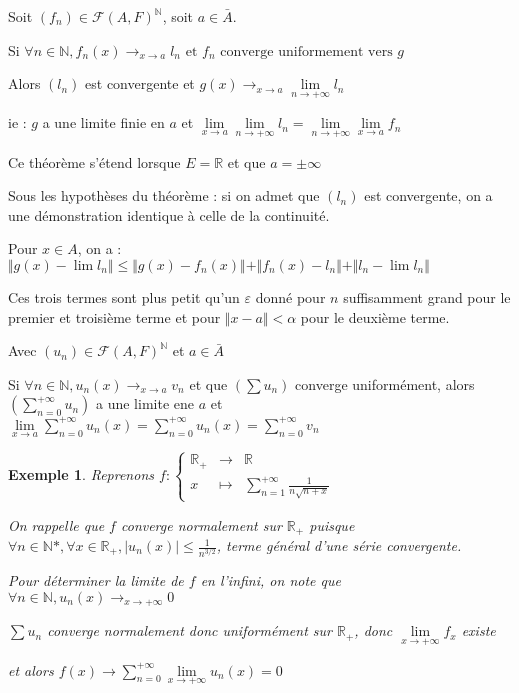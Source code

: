 \documentclass[a4paper,12pt]{book}
\newcommand{\Thr}[2]{\begin{tcolorbox}[sharp corners, colback=white,colframe=red!90!black!75, title=Théorème : #1]#2\end{tcolorbox}}
\newcommand{\Pre}[1]{\begin{tcolorbox}[sharp corners, colback=white,colframe=green!60!green!30!black!75, title=Preuve]#1\end{tcolorbox}}
\newtheorem{Exe}{Exemple}[section]
\def\R{\mathbb{R}}
\def\N{\mathbb{N}}
\begin{document}
\Thr{Extension de limite uniforme}{Soit $(f_n)\in\mathcal{F}(A,F)^\N$, soit $a\in\bar{A}$. \par Si $\forall n\in\N, f_n(x)\to_{x\to a}l_n\text{ et }f_n\text{ converge uniformement vers }g$ \par Alors $(l_n)$ est convergente et $g(x)\to_{x\to a}\lim\limits_{n\to+\infty}l_n$
\par ie : $g$ a une limite finie en $a$ et $\lim\limits_{x\to a} \lim\limits_{n\to+\infty}l_n = \lim\limits_{n\to+\infty}\lim\limits_{x\to a} f_n$ \par Ce théorème s'étend lorsque $E=\R$ et que $a=\pm\infty$}
\Pre{Sous les hypothèses du théorème : si on admet que $(l_n)$ est convergente, on a une démonstration identique à celle de la continuité. \par Pour $x\in A$, on a : $\Vert g(x)-\lim l_n\Vert\leq \Vert g(x)-f_n(x)\Vert + \Vert f_n(x)-l_n\Vert + \Vert l_n-\lim l_n\Vert$ \par Ces trois termes sont plus petit qu'un $\varepsilon$ donné pour $n$ suffisamment grand pour le premier et troisième terme et pour $\Vert x-a\Vert<\alpha$ pour le deuxième terme.}
\Thr{échange de limites de séries}{Avec $(u_n)\in\mathcal{F}(A,F)^\N$ et $a\in\bar{A}$ \par Si $\forall n\in\N, u_n(x)\to_{x\to a}v_n$ et que $(\sum u_n)$ converge uniformément, alors $\left(\sum\limits_{n=0}^{+\infty}u_n\right)$ a une limite ene $a$ et $\lim\limits_{x\to a}\sum\limits_{n=0}^{+\infty}u_n(x)=\sum\limits_{n=0}^{+\infty}u_n(x)=\sum\limits_{n=0}^{+\infty}v_n$}
\begin{Exe}
Reprenons $f:\left\{\begin{array}{rcl} \R_+ & \to & \R \\ x & \mapsto & \sum\limits_{n=1}^{+\infty}\frac{1}{n\sqrt{n+x}}\end{array}\right.$
\par On rappelle que $f$ converge normalement sur $\R_+$ puisque $\forall n\in\N*, \forall x\in\R_+, \vert u_n(x)\vert\leq \frac{1}{n^{3/2}}$, terme général d'une série convergente.
\par Pour déterminer la limite de $f$ en l'infini, on note que $\forall n\in\N, u_n(x)\to_{x\to+\infty}0$
\par $\sum u_n$ converge normalement donc uniformément sur $\R_+$, donc $\lim\limits_{x\to+\infty} f_x$ existe
\par et alors $f(x)\to \sum\limits_{n=0}^{+\infty}\lim\limits_{x\to+\infty} u_n(x) = 0$
\end{Exe}
\end{document}
